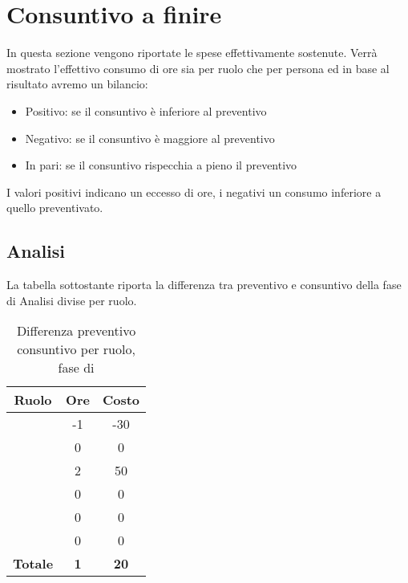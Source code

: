 \section{Consuntivo a finire}
In questa sezione vengono riportate le spese effettivamente sostenute. Verrà mostrato l'effettivo consumo di ore sia per ruolo che per persona ed in base al risultato avremo un bilancio:
\begin{itemize}
	\item Positivo: se il consuntivo è inferiore al preventivo
	\item Negativo: se il consuntivo è maggiore al preventivo
	\item In pari: se il consuntivo rispecchia a pieno il preventivo
\end{itemize}
I valori positivi indicano un eccesso di ore, i negativi un consumo inferiore a quello preventivato.

\subsection{Analisi}
La tabella sottostante riporta la differenza tra preventivo e consuntivo della fase di Analisi divise per ruolo.
\begin{table}[H]
	\centering
	\begin{tabular}{|c|c|c|}
		\hline
		\textbf{Ruolo} &
		\textbf{Ore} &
		\textbf{Costo} \\
		\hline
		\Responsabile & -1 & -30\\
		\hline
		\Amministratore & 0 & 0\\
		\hline
		\Analista & 2 & 50\\
		\hline
		\Progettista & 0 & 0 \\
		\hline
		\Verificatore & 0 & 0\\
		\hline
		\Programmatore & 0 & 0 \\
		\hline
		\textbf{Totale} & \textbf{1} & \textbf{20} \\
		\hline
	\end{tabular}
	\caption{Differenza preventivo consuntivo per ruolo, fase di \AR}
\end{table}

